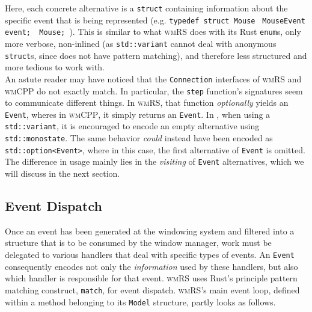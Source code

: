 Here,   each   concrete   alternative   is   a   \cpp   \texttt{struct}
containing   information    about   the    specific   event   that    is   being
represented  (e.g.  \texttt{typedef  struct  Mouse}  \texttt{{
MouseEvent  event;  }   Mouse;  }).  This  is  similar   to  what  \textsc{wmRS}
does   with    its   Rust    \texttt{enum}s,   only    more   verbose,
non-inlined  (as  \texttt{std::variant}   cannot  deal  with  anonymous
\texttt{struct}s,  since  \cpp does  not  have  pattern matching),  and
therefore less structured and more tedious to work with.\\


An astute  reader may  have noticed that  the \texttt{Connection}  interfaces of
\textsc{wmRS}  and  \textsc{wmCPP} do  not  exactly  match. In  particular,  the
\texttt{step}  function's signatures  seem to  communicate different  things. In
\textsc{wmRS},  that  function  \textit{optionally}  yields  an  \texttt{Event},
wheres  in  \textsc{wmCPP},  it  simply  returns  an  \texttt{Event}.  In  \cpp,
when  using  a  \texttt{std::variant},   it  is  encouraged  to  encode
an   empty   alternative  using   \texttt{std::monostate}\cite{cppstd}.
The   same    behavior   \textit{could}    instead   have   been    encoded   as
\texttt{std::option<Event>}, where in this  case, the first alternative
of  \texttt{Event} is  omitted.  The  difference in  usage  mainly  lies in  the
\textit{visiting} of \texttt{Event}  alternatives, which we will  discuss in the
next section.

\subsection{Event Dispatch}

Once an  event has been  generated at the windowing  system and filtered  into a
structure that is to  be consumed by the window manager,  work must be delegated
to various handlers  that deal with specific types of  events. An \texttt{Event}
consequently encodes not  only the \textit{information} used  by these handlers,
but  also  which handler  is  responsible  for  that event.  \textsc{wmRS}  uses
Rust's principle pattern matching construct, \texttt{match}, for event
dispatch. \textsc{wmRS}'s main event loop,  defined within a method belonging to
its \texttt{Model} structure, partly looks as follows.

